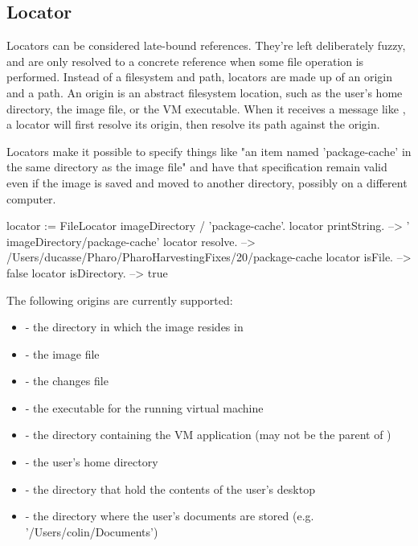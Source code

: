 \documentclass[a4paper,10pt,twoside]{book}
\begin{document}
\subsection{Locator}

Locators can be considered late-bound references. They're left deliberately fuzzy, and are only resolved to a concrete reference when some file operation is performed. Instead of a filesystem and path, locators are made up of an origin and a path. An origin is an abstract filesystem location, such as the user's home directory, the image file, or the VM executable. When it receives a message like , a locator will first resolve its origin, then resolve its path against the origin.

Locators make it possible to specify things like "an item named 'package-cache' in the same directory as the image file" and have that specification remain valid even if the image is saved and moved to another directory, possibly on a different computer.

\begin{code}{}
    locator := FileLocator imageDirectory / 'package-cache'.
    locator printString.             --> ' {imageDirectory}/package-cache'
    locator resolve.                 -->  /Users/ducasse/Pharo/PharoHarvestingFixes/20/package-cache
    locator isFile.                  --> false
    locator isDirectory.             --> true
\end{code}	

The following origins are currently supported:

\begin{itemize}
\item {} - the directory in which the image resides in
\item{} - the image file
\item{} - the changes file
\item{} - the executable for the running virtual machine
\item{} - the directory containing the VM application (may not be the parent of )
\item{} - the user's home directory
\item{} - the directory that hold the contents of the user's desktop
\item{} - the directory where the user's documents are stored (e.g. '/Users/colin/Documents')
\end{itemize}
\end{document}
